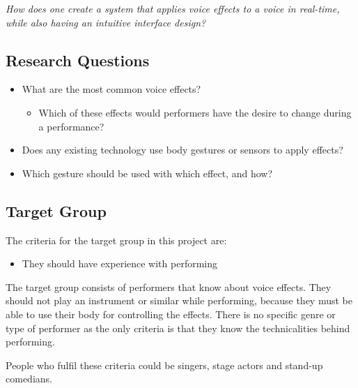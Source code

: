 \textit{How does one create a system that applies voice effects to a voice in real-time, while also having an intuitive interface design?}


\subsection{Research Questions}\label{sub:ResearchQ}

\begin{itemize}
	\item What are the most common voice effects?
	\begin{itemize}
		\item Which of these effects would performers have the desire to change during a performance?
	\end{itemize}
	\item Does any existing technology use body gestures or sensors to apply effects?
	\item Which gesture should be used with which effect, and how?
\end{itemize}

\subsection{Target Group}
The criteria for the target group in this project are:

\begin{itemize}
	\item They should have experience with performing 
\end{itemize}

The target group consists of performers that know about voice effects. They should not play an instrument or similar while performing, because they must be able to use their body for controlling the effects. There is no specific genre or type of performer as the only criteria is that they know the technicalities behind performing.

People who fulfil these criteria could be singers, stage actors and stand-up comedians.